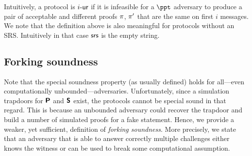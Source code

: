 
Intuitively, a protocol is ${i\text{-}\mathsf{ur}}$ if it is infeasible for a $\ppt$ adversary
to produce a pair of acceptable and different proofs $\pi$, $\pi'$
that are the same on  first $i$ messages. 
We note that the definition above is also meaningful for protocols without an SRS. Intuitively in that case $\mathsf{srs}$ is the empty string.

\iffalse
\subsection{Forking soundness}
Note that the special soundness property (as usually defined) holds for
all---even computationally unbounded---adversaries. Unfortunately, since a
simulation trapdoors for $\bm{\mathsf{P}}$ and $\bm{\mathsf{S}}$ exist, the protocols
cannot be special sound in that regard. This is because an unbounded adversary
could recover the trapdoor and build a number of simulated proofs for a fake
statement. Hence, we provide a weaker, yet sufficient, definition of
\emph{forking soundness}. More precisely, we state that an
adversary that is able to answer correctly multiple challenges either knows the
witness or can be used to break some computational assumption.


